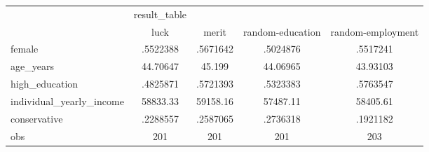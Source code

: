 \begin{tabular}{l*{4}{c}}
\hline\hline
            &result\_table&            &            &            \\
            &        luck&       merit&random-education&random-employment\\
\hline
female      &    .5522388&    .5671642&    .5024876&    .5517241\\
age\_years   &    44.70647&      45.199&    44.06965&    43.93103\\
high\_education&    .4825871&    .5721393&    .5323383&    .5763547\\
individual\_yearly\_income&    58833.33&    59158.16&    57487.11&    58405.61\\
conservative&    .2288557&    .2587065&    .2736318&    .1921182\\
obs         &         201&         201&         201&         203\\
\hline\hline
\end{tabular}
